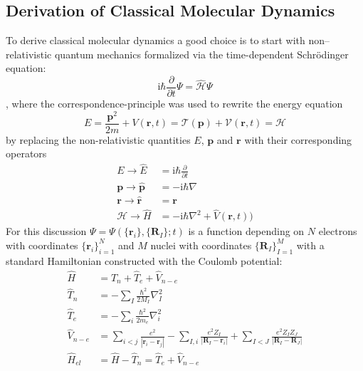 \documentclass[12pt]{scrartcl}
\begin{document}
\subsection{Derivation of Classical Molecular Dynamics}
To derive classical molecular dynamics a good choice is to start with non–relativistic quantum mechanics formalized via the time-dependent Schr\"odinger equation:
\begin{equation}
\mathrm{i} \hbar \frac{\partial }{\partial t} \Psi = \hat{\mathcal{H}} \Psi
\label{eq:tdse}
\end{equation}
, where the correspondence-principle was used to rewrite the energy equation
\begin{equation}
E=\frac{\mathbf{p}^2}{2m}+V(\mathbf{r},t)=\mathcal{T}(\mathbf{p})+\mathcal{V}(\mathbf{r},t)=\mathcal{H}
\end{equation} 
by replacing the non-relativistic quantities $E$, $\mathbf{p}$ and $\mathbf{r}$ with their corresponding operators
\begin{align*}
E \rightarrow \hat{E} &=\mathrm{i}\hbar \frac{\partial }{\partial t}\\
\mathbf{p} \rightarrow \hat{\mathbf{p}} &=-\mathrm{i}\hbar \nabla\\
\mathbf{r} \rightarrow \hat{\mathbf{r}}  &= \mathbf{r}\\
\mathcal{H} \rightarrow \hat{H} &=-\mathrm{i}\hbar \nabla^2 + \hat{V}(\mathbf{r},t))
\end{align*}
For this discussion $\Psi=\Psi(\{\mathbf{r}_i\},\{\mathbf{R}_I \};t)$ is a function depending on $N$ electrons with coordinates $\{\mathbf{r}_i\}_{i=1}^{N}$ and $M$ nuclei with coordinates $\{\mathbf{R}_I\}_{I=1}^{M}$ with a standard Hamiltonian constructed with the Coulomb potential:
\begin{align}
\hat{H} &=\hat{T}_n + \hat{T}_e + \hat{V}_{n-e}\label{def:hamiltonian}\\
\hat{T}_n &=-\sum_{I}\frac{\hbar^2}{2M_I} \nabla^2_I\label{def:nuclearkinetic}\\
\hat{T}_e &=-\sum_{i}\frac{\hbar^2}{2m_e} \nabla^2_i\label{def:electronickinetic}\\
\hat{V}_{n-e}&=\sum_{i<j}\frac{e^2}{|\mathbf{r}_i-\mathbf{r}_j|} - \sum_{I,i}\frac{e^2Z_I}{|\mathbf{R}_I-\mathbf{r}_i|} + \sum_{I<J}\frac{e^2Z_IZ_J}{|\mathbf{R}_I-\mathbf{R}_J|}\label{def:coulomboperator}\\
\hat{H}_{el}&=\hat{H}-\hat{T}_n=\hat{T}_e + \hat{V}_{n-e}\label{def:electronichamilton}
\end{align}
\end{document}
